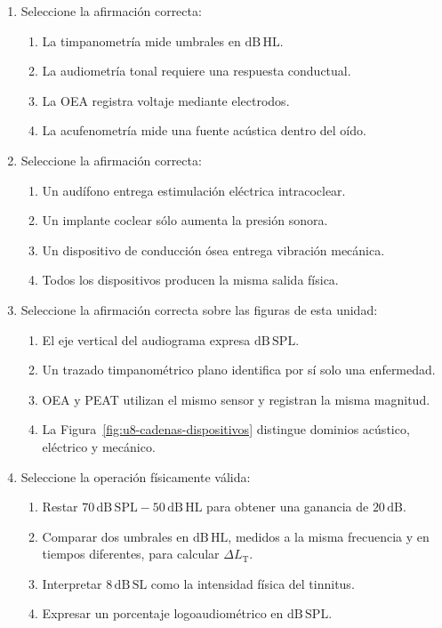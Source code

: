 \begin{enumerate}[label=\textbf{D\arabic*.},leftmargin=*]
    \item Seleccione la afirmación correcta:
    \begin{enumerate}
        \item La timpanometría mide umbrales en \(\mathrm{dB\,HL}\).
        \item La audiometría tonal requiere una respuesta conductual.
        \item La OEA registra voltaje mediante electrodos.
        \item La acufenometría mide una fuente acústica dentro del oído.
    \end{enumerate}

    \item Seleccione la afirmación correcta:
    \begin{enumerate}
        \item Un audífono entrega estimulación eléctrica intracoclear.
        \item Un implante coclear sólo aumenta la presión sonora.
        \item Un dispositivo de conducción ósea entrega vibración mecánica.
        \item Todos los dispositivos producen la misma salida física.
    \end{enumerate}

    \item Seleccione la afirmación correcta sobre las figuras de esta unidad:
    \begin{enumerate}
        \item El eje vertical del audiograma expresa
        \(\mathrm{dB\,SPL}\).
        \item Un trazado timpanométrico plano identifica por sí solo una
        enfermedad.
        \item OEA y PEAT utilizan el mismo sensor y registran la misma
        magnitud.
        \item La Figura~\ref{fig:u8-cadenas-dispositivos} distingue dominios
        acústico, eléctrico y mecánico.
    \end{enumerate}

    \item Seleccione la operación físicamente válida:
    \begin{enumerate}
        \item Restar \(70\,\mathrm{dB\,SPL}-50\,\mathrm{dB\,HL}\) para obtener
        una ganancia de \(20\,\mathrm{dB}\).
        \item Comparar dos umbrales en \(\mathrm{dB\,HL}\), medidos a la misma
        frecuencia y en tiempos diferentes, para calcular
        \(\Delta L_{\mathrm{T}}\).
        \item Interpretar \(8\,\mathrm{dB\,SL}\) como la intensidad física del
        tinnitus.
        \item Expresar un porcentaje logoaudiométrico en
        \(\mathrm{dB\,SPL}\).
    \end{enumerate}


\end{enumerate}
